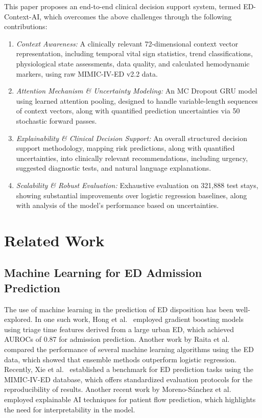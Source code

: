\documentclass[conference]{IEEEtran}
\begin{document}
This paper proposes an end-to-end clinical decision support system, termed ED-Context-AI, which overcomes the above challenges through the following contributions:

\begin{enumerate}
    \item \textit{Context Awareness:} A clinically relevant 72-dimensional context vector representation, including temporal vital sign statistics, trend classifications, physiological state assessments, data quality, and calculated hemodynamic markers, using raw MIMIC-IV-ED v2.2 data.
    \item \textit{Attention Mechanism \& Uncertainty Modeling:} An MC Dropout GRU model using learned attention pooling, designed to handle variable-length sequences of context vectors, along with quantified prediction uncertainties via 50 stochastic forward passes.
    \item \textit{Explainability \& Clinical Decision Support:} An overall structured decision support methodology, mapping risk predictions, along with quantified uncertainties, into clinically relevant recommendations, including urgency, suggested diagnostic tests, and natural language explanations.
    \item \textit{Scalability \& Robust Evaluation:} Exhaustive evaluation on 321,888 test stays, showing substantial improvements over logistic regression baselines, along with analysis of the model's performance based on uncertainties.
\end{enumerate}

\section{Related Work}

\subsection{Machine Learning for ED Admission Prediction}

The use of machine learning in the prediction of ED disposition has been well-explored. In one such work, Hong et al.~\cite{Hong2018} employed gradient boosting models using triage time features derived from a large urban ED, which achieved AUROCs of 0.87 for admission prediction. Another work by Raita et al.~\cite{Raita2019} compared the performance of several machine learning algorithms using the ED data, which showed that ensemble methods outperform logistic regression. Recently, Xie et al.~\cite{Xie2022} established a benchmark for ED prediction tasks using the MIMIC-IV-ED database, which offers standardized evaluation protocols for the reproducibility of results. Another recent work by Moreno-S\'{a}nchez et al.~\cite{Moreno2024} employed explainable AI techniques for patient flow prediction, which highlights the need for interpretability in the model.
\end{document}
